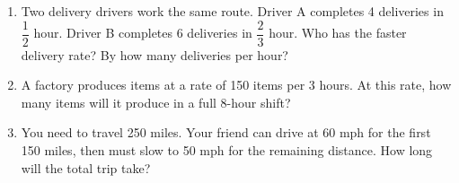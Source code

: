\documentclass[12pt, letterpaper, fleqn]{article}
\begin{document}
\begin{enumerate}[itemsep=2.5cm, leftmargin=0.6cm]

\item Two delivery drivers work the same route. Driver A completes 4 deliveries in $\dfrac{1}{2}$ hour. Driver B completes 6 deliveries in $\dfrac{2}{3}$ hour. Who has the faster delivery rate? By how many deliveries per hour?
\vspace{3cm}

\item A factory produces items at a rate of 150 items per 3 hours. At this rate, how many items will it produce in a full 8-hour shift?
\vspace{2.5cm}

\item You need to travel 250 miles. Your friend can drive at 60 mph for the first 150 miles, then must slow to 50 mph for the remaining distance. How long will the total trip take?
\vspace{3cm}

\end{enumerate}
\end{document}
